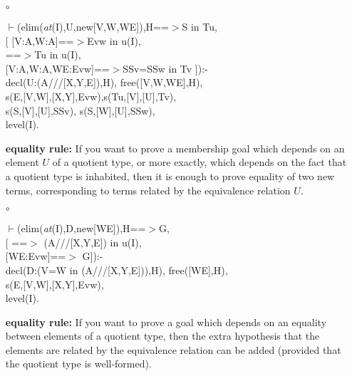 \documentclass[11pt]{report}
\begin{document}
 \begin{enumerate}
 \item[$\circ$]
\begin{sf}\begin{tabbing}
$\vdash$(elim(\mbox{\it at}(I),U,new[V,W,WE]),H==$>$S in Tu,\\[-0.15ex]
\hspace{2em}[ [V:A,W:A]==$>$Evw in u(I),\\[-0.15ex]
\hspace{3em}==$>$Tu in u(I),\\[-0.15ex]
\hspace{3em}[V:A,W:A,WE:Evw]==$>$SSv=SSw in Tv ]):-\\[-0.15ex]
\hspace{2em}decl(U:(A///[X,Y,E]),H), free([V,W,WE],H),\\[-0.15ex]
\hspace{2em}s(E,[V,W],[X,Y],Evw),s(Tu,[V],[U],Tv),\\[-0.15ex]
\hspace{2em}s(S,[V],[U],SSv), s(S,[W],[U],SSw), \\[-0.15ex]
\hspace{2em}level(I).
\end{tabbing}\end{sf}

 {\bf equality rule:}
 If you want to prove a membership goal which depends on  an element $U$
 of a quotient type, or more exactly, which depends on the
 fact that a quotient type is inhabited, then it is enough to
 prove equality of two new terms, corresponding to terms related by the 
 equivalence relation $U$.
 \item[$\circ$]
\begin{sf}\begin{tabbing}
$\vdash$(elim(\mbox{\it at}(I),D,new[WE]),H==$>$G,\\[-0.15ex]
\hspace{2em}[ ==$>$ (A///[X,Y,E]) in u(I),\\[-0.15ex]
\hspace{3em}[WE:Evw]==$>$ G]):-\\[-0.15ex]
\hspace{2em}decl(D:(V=W in (A///[X,Y,E])),H), free([WE],H),\\[-0.15ex]
\hspace{2em}s(E,[V,W],[X,Y],Evw),\\[-0.15ex]
\hspace{2em}level(I).
\end{tabbing}\end{sf}

 {\bf equality rule:}
 If you want to prove a goal which depends on  an equality between
 elements of a quotient type, then the extra hypothesis that the
 elements are related by the equivalence relation can be added
 (provided that the quotient type is well-formed).
 
 \end{enumerate}
  
\end{document}
